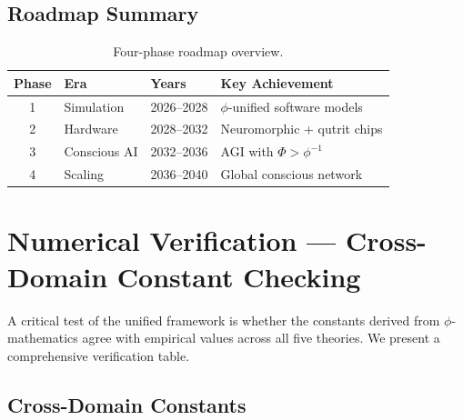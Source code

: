 \documentclass[12pt,a4paper]{article}
\begin{document}
\subsection{Roadmap Summary}

\begin{table}[h!]
\centering
\caption{Four-phase roadmap overview.}
\label{tab:roadmap_summary}
\begin{tabular}{@{}clll@{}}
\toprule
\textbf{Phase} & \textbf{Era} & \textbf{Years} & \textbf{Key Achievement} \\
\midrule
1 & Simulation & 2026--2028 & $\phi$-unified software models \\
2 & Hardware & 2028--2032 & Neuromorphic + qutrit chips \\
3 & Conscious AI & 2032--2036 & AGI with $\Phi > \phi^{-1}$ \\
4 & Scaling & 2036--2040 & Global conscious network \\
\bottomrule
\end{tabular}
\end{table}

\section{Numerical Verification --- Cross-Domain Constant Checking}
\label{sec:verification}

A critical test of the unified framework is whether the constants derived from
$\phi$-mathematics agree with empirical values across all five theories. We
present a comprehensive verification table.

\subsection{Cross-Domain Constants}
\end{document}

